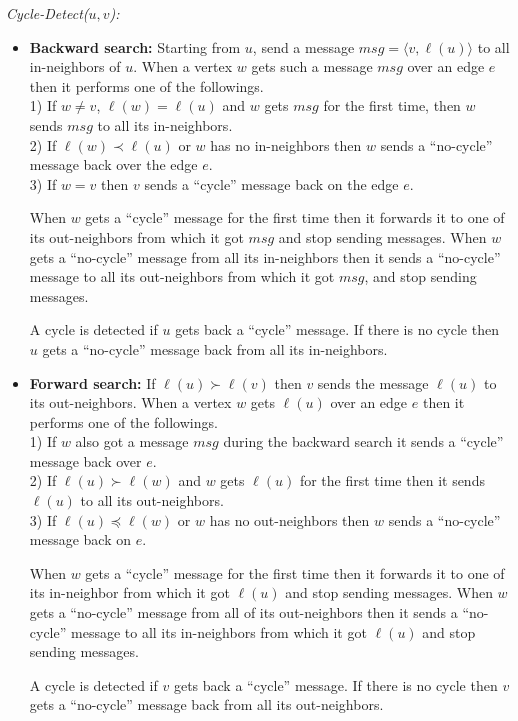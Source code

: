 \documentclass[11pt]{article}
\theoremstyle{plain}
\theoremstyle{definition}
\theoremstyle{remark}
\numberwithin{equation}{section}
\DeclareMathOperator{\glex}{\prec}
\DeclareMathOperator{\geqlex}{\preceq}
\DeclareMathOperator{\llex}{\succ}
\begin{document}
\emph{Cycle-Detect($u,v$):}
\begin{itemize}
\item {\bf Backward search:} Starting from $u$,
send a message $msg=\langle v,\ell(u) \rangle$ to all in-neighbors of $u$. When a vertex $w$ gets such a
message $msg$ over an edge $e$ then it performs one of the
followings.\\
1) If $w\not=v$,  $\ell(w)=\ell(u)$ and $w$ gets $msg$ for the first time, then $w$ sends  $msg$ to all its in-neighbors. \\
2) If $\ell(w) \glex \ell(u)$ or $w$ has no in-neighbors then $w$
sends a ``no-cycle'' message back over the edge $e$.\\
3) If $w=v$ then $v$ sends a ``cycle'' message back on the edge $e$.


When $w$ gets a ``cycle'' message  for the first time then it
forwards it to one of its out-neighbors from which it got $msg$ and
stop sending messages. When $w$ gets a ``no-cycle'' message from all
 its in-neighbors then it sends a ``no-cycle'' message to all its
out-neighbors from which it got $msg$,  and stop sending messages.

A cycle is detected if $u$ gets back a ``cycle'' message. If there
is no cycle then $u$ gets a ``no-cycle'' message back from all its
in-neighbors.

\smallskip

\item{\bf Forward search:}
 If $\ell(u)\llex \ell(v)$ then $v$ sends the message
 $\ell(u)$ to its out-neighbors.
When a vertex $w$ gets $\ell(u)$ over an edge $e$ then it
performs one of the followings. \\
1) If $w$ also got a message $msg$ during
 the backward search it sends a ``cycle'' message back over $e$. \\
2) If  $\ell(u)\llex \ell(w)$  and $w$ gets $\ell(u)$ for the first time
then it sends $\ell(u)$  to all its out-neighbors.\\
3) If  $\ell(u)\geqlex \ell(w)$
 or $w$ has no
out-neighbors then $w$ sends a ``no-cycle'' message back on $e$.

When $w$ gets a ``cycle'' message  for the first time then it
forwards it to one of its in-neighbor from which it got $\ell(u)$
and stop sending messages. When $w$ gets a ``no-cycle'' message from
all of its out-neighbors then it sends a ``no-cycle'' message to all
its in-neighbors from which it got $\ell(u)$ and stop sending
messages.

A cycle is detected if $v$ gets back a ``cycle'' message. If there
is no cycle then $v$ gets a ``no-cycle'' message back from all its
out-neighbors.

\end{itemize}
\end{document}
